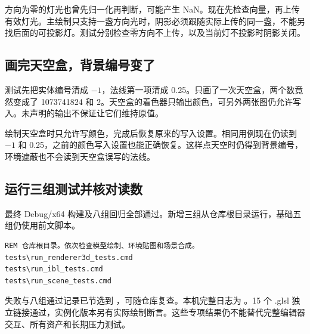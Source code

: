 方向为零的灯光也曾先归一化再判断，可能产生 NaN。现在先检查向量，再上传有效灯光。主绘制只支持一盏方向光时，阴影必须跟随实际上传的同一盏，不能另找后面的可投影灯。测试分别检查零方向不上传，以及当前灯不投影时阴影关闭。

\subsection{画完天空盒，背景编号变了}
测试先把实体编号清成 $-1$，法线第一项清成 0.25。只画了一次天空盒，两个数竟然变成了 1073741824 和 2。天空盒的着色器只输出颜色，可另外两张图仍允许写入。未声明的输出不保证让它们维持原值。

绘制天空盒时只允许写颜色，完成后恢复原来的写入设置。相同用例现在仍读到 $-1$ 和 0.25，之前的颜色写入设置也能正确恢复。这样点天空时仍得到背景编号，环境遮蔽也不会读到天空盒误写的法线。

\subsection{运行三组测试并核对读数}
最终 Debug/x64 构建及八组回归全部通过。新增三组从仓库根目录运行，基础五组仍使用前文脚本。
\begin{verbatim}
REM 仓库根目录。依次检查模型绘制、环境贴图和场景合成。
tests\run_renderer3d_tests.cmd
tests\run_ibl_tests.cmd
tests\run_scene_tests.cmd
\end{verbatim}
失败与八组通过记录已节选到 ，可随仓库复查。本机完整日志为 。15 个 .glsl 独立链接通过，实例化版本另有实际绘制断言。这些专项结果仍不能替代完整编辑器交互、所有资产和长期压力测试。

